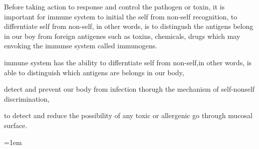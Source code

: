 \documentclass[12pt]{article}
\begin{document}
Before taking action to response and control the pathogen or toxin,
it is important for immune system to initial the self from non-self recognition, to differntiate self from non-self, in other words, is to distingush the antigens belong in our boy from foreign antigenes such as toxins, chemicals, drugs which may envoking the immunse system called immunogens.

immune system has the ability to differntiate self from non-self,in other words, is able to distinguish which antigens are belongs in our body, 


detect and prevent our body from infection thorugh the  mechanism of self-nonself discrimination, 


to detect and reduce the possibility of any toxic or allergenic go through mucosal surface.

 


\emergencystretch=1em
\printbibliography[title=Reference]
\end{document}
